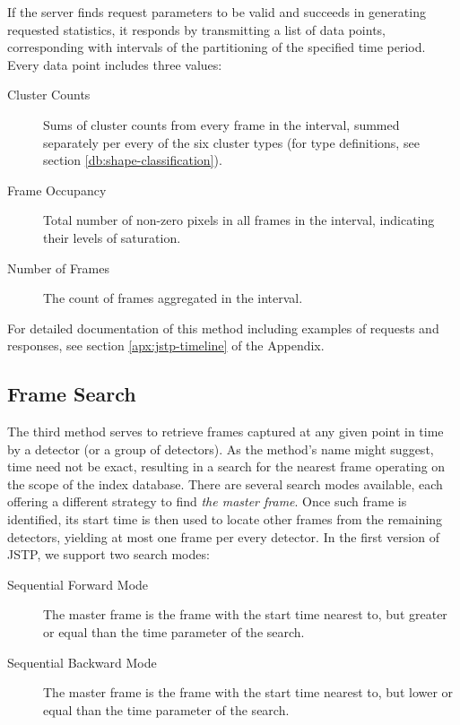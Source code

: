 If the server finds request parameters to be valid and succeeds in generating requested statistics, it responds by transmitting a list of data points, corresponding with intervals of the partitioning of the specified time period. Every data point includes three values:

\begin{description}
	\item[Cluster Counts]
	Sums of cluster counts from every frame in the interval, summed separately per every of the six cluster types (for type definitions, see section \ref{db:shape-classification}).

	\item[Frame Occupancy]
	Total number of non-zero pixels in all frames in the interval, indicating their levels of saturation.

	\item[Number of Frames]
	The count of frames aggregated in the interval.
\end{description}

For detailed documentation of this method including examples of requests and responses, see section \ref{apx:jstp-timeline} of the Appendix.

\subsection{Frame Search}
The third method serves to retrieve frames captured at any given point in time by a detector (or a group of detectors). As the method's name might suggest, time need not be exact, resulting in a search for the nearest frame operating on the scope of the index database. There are several search modes available, each offering a different strategy to find \textit{the master frame}. Once such frame is identified, its start time is then used to locate other frames from the remaining detectors, yielding at most one frame per every detector. In the first version of JSTP, we support two search modes:

\begin{description}
	\item[Sequential Forward Mode]
	The master frame is the frame with the start time nearest to, but greater or equal than the time parameter of the search.

	\item[Sequential Backward Mode]
	The master frame is the frame with the start time nearest to, but lower or equal than the time parameter of the search.

\end{description}

